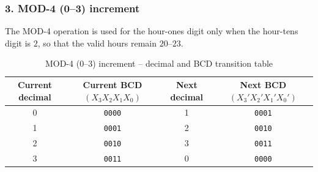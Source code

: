 \documentclass[12pt,letterpaper]{article}
\begin{document}
\subsubsection{3. MOD-4 (0--3) increment}
The MOD-4 operation is used for the hour-ones digit only
when the hour-tens digit is \(2\), so that the valid hours remain \(20\)--\(23\).

\begin{table}[H]\centering
\caption{MOD-4 (0--3) increment -- decimal and BCD transition table}
\label{tab:kmap-mod4-inc-trans}
\scriptsize
\begin{tabular}{c c c c}\toprule
Current decimal & Current BCD $(X_3X_2X_1X_0)$ & Next decimal & Next BCD $(X_3'X_2'X_1'X_0')$ \\
\midrule
0 & \texttt{0000} & 1 & \texttt{0001} \\
1 & \texttt{0001} & 2 & \texttt{0010} \\
2 & \texttt{0010} & 3 & \texttt{0011} \\
3 & \texttt{0011} & 0 & \texttt{0000} \\
\bottomrule
\end{tabular}
\end{table}
\end{document}
